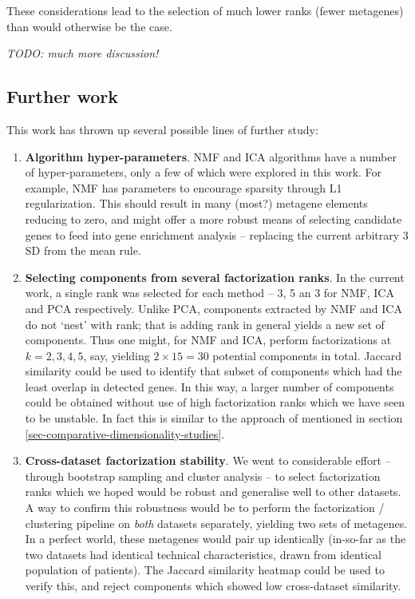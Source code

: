 \documentclass[draft,tikz, 12pt,a4paper,oneside,fleqn]{article}
\begin{document}
These considerations lead to the selection of much lower ranks (fewer metagenes) than would otherwise be the case.

\emph{TODO: much more discussion!}


\subsection{Further work}

This work has thrown up several possible lines of further study:
\begin{enumerate}
\item
{\bf Algorithm hyper-parameters}.  NMF and ICA algorithms have a number of hyper-parameters, only a few of which were explored in this work.  For example, NMF has parameters to encourage sparsity through L1 regularization.   This should result in many (most?) metagene elements reducing to zero, and might offer a more robust means of selecting candidate genes to feed into gene enrichment analysis -- replacing the current arbitrary 3 SD from the mean rule.
\item
{\bf Selecting components from several factorization ranks}.
In the current work, a single rank was selected for each method -- 3, 5 an 3 for NMF, ICA and PCA respectively.  Unlike PCA, components extracted by NMF and ICA  do not `nest' with rank; that is adding rank in general yields a new set of components.  Thus one might, for NMF and ICA, perform factorizations at $k=2,3,4,5$, say, yielding $2 \times 15 = 30$ potential components in total.  Jaccard similarity could be used to identify that subset of components which had the least overlap in detected genes.   In this way, a larger number of components could be obtained without use of high factorization ranks which we have seen to be unstable.  In fact this is similar to the approach of \cite{WayGregory2019} mentioned in section \ref{sec-comparative-dimensionality-studies}.
\item
{\bf Cross-dataset factorization stability}.  We went to considerable effort -- through bootstrap sampling and cluster analysis -- to select factorization ranks which we hoped would be robust and generalise well to other datasets.   A way to confirm this robustness would be to perform the factorization / clustering pipeline on \emph{both} datasets separately, yielding two sets of metagenes.  In a perfect world, these metagenes would pair up identically (in-so-far as the two datasets had identical technical characteristics, drawn from identical population of patients).  The Jaccard similarity heatmap could be used to verify this, and reject components which showed low cross-dataset similarity.

\end{enumerate}
\end{document}

